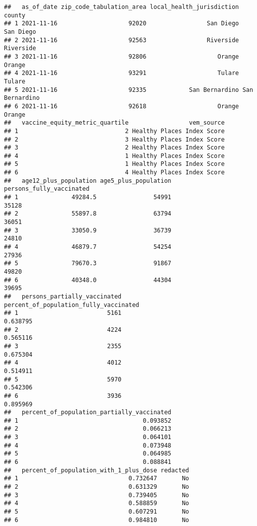 \documentclass[
]{article}
\begin{document}
\begin{verbatim}
##   as_of_date zip_code_tabulation_area local_health_jurisdiction         county
## 1 2021-11-16                    92020                 San Diego      San Diego
## 2 2021-11-16                    92563                 Riverside      Riverside
## 3 2021-11-16                    92806                    Orange         Orange
## 4 2021-11-16                    93291                    Tulare         Tulare
## 5 2021-11-16                    92335            San Bernardino San Bernardino
## 6 2021-11-16                    92618                    Orange         Orange
##   vaccine_equity_metric_quartile                 vem_source
## 1                              2 Healthy Places Index Score
## 2                              3 Healthy Places Index Score
## 3                              2 Healthy Places Index Score
## 4                              1 Healthy Places Index Score
## 5                              1 Healthy Places Index Score
## 6                              4 Healthy Places Index Score
##   age12_plus_population age5_plus_population persons_fully_vaccinated
## 1               49284.5                54991                    35128
## 2               55897.8                63794                    36051
## 3               33050.9                36739                    24810
## 4               46879.7                54254                    27936
## 5               79670.3                91867                    49820
## 6               40348.0                44304                    39695
##   persons_partially_vaccinated percent_of_population_fully_vaccinated
## 1                         5161                               0.638795
## 2                         4224                               0.565116
## 3                         2355                               0.675304
## 4                         4012                               0.514911
## 5                         5970                               0.542306
## 6                         3936                               0.895969
##   percent_of_population_partially_vaccinated
## 1                                   0.093852
## 2                                   0.066213
## 3                                   0.064101
## 4                                   0.073948
## 5                                   0.064985
## 6                                   0.088841
##   percent_of_population_with_1_plus_dose redacted
## 1                               0.732647       No
## 2                               0.631329       No
## 3                               0.739405       No
## 4                               0.588859       No
## 5                               0.607291       No
## 6                               0.984810       No
\end{verbatim}
\end{document}
